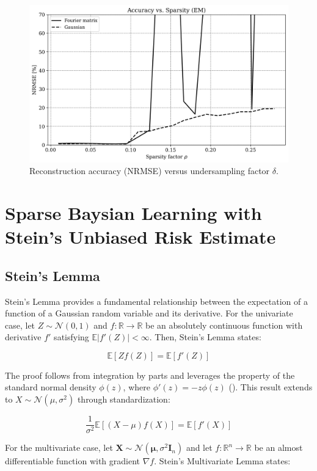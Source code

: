 \documentclass{article}
\begin{document}
\begin{figure}[H]
    \centering
    \includegraphics[width=0.75\linewidth]{Figures/accuracy_vs_sparsity_FFTGauss_EM.png}
    \caption{Reconstruction accuracy (NRMSE) versus undersampling factor $ \delta $.}
    \label{fig:accuracy_vs_sparsity_EM_gaussFFT}
\end{figure}


\section{Sparse Baysian Learning with Stein's Unbiased Risk Estimate}
\label{sec:SBL_SURE}
\subsection{Stein's Lemma}
Stein's Lemma provides a fundamental relationship between the expectation of a function of a Gaussian random variable and its derivative. For the univariate case, let $Z \sim \mathcal{N}(0, 1)$ and $f: \mathbb{R} \to \mathbb{R}$ be an absolutely continuous function with derivative $f'$ satisfying $\mathbb{E}|f'(Z)| < \infty$. Then, Stein's Lemma states:

\begin{equation}
    \mathbb{E}[Zf(Z)] = \mathbb{E}[f'(Z)]
\end{equation}

The proof follows from integration by parts and leverages the property of the standard normal density $\phi(z)$, where $\phi'(z) = -z\phi(z)$ (\citet{Tibshirani2015SteinS}). This result extends to $X \sim \mathcal{N}(\mu, \sigma^2)$ through standardization:

\begin{equation}
    \frac{1}{\sigma^2}\mathbb{E}[(X - \mu)f(X)] = \mathbb{E}[f'(X)]
\end{equation}

For the multivariate case, let $\mathbf{X} \sim \mathcal{N}(\boldsymbol{\mu}, \sigma^2 \mathbf{I}_n)$ and let $f: \mathbb{R}^n \to \mathbb{R}$ be an almost differentiable function with gradient $\nabla f$. Stein's Multivariate Lemma states:
\end{document}
